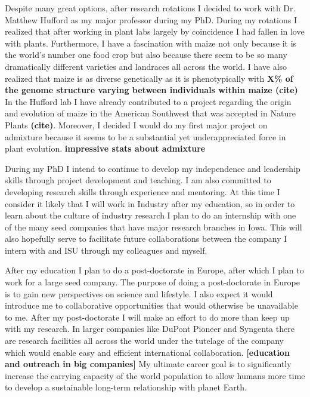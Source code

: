 \documentclass[12pt]{amsart}
\newcommand{\mbh}[1]{\textcolor{red}{ \emph{\scriptsize  #1}} }
\begin{document}
Despite many great options, after research rotations I decided to work with Dr. Matthew Hufford as my major professor during my PhD.
During my rotations I realized that after working in plant labs largely by coincidence I had fallen in love with plants.
Furthermore, I have a fascination with maize not only because it is the world's number one food crop but also because there seem to be so many dramatically different varieties and landraces all across the world.
I have also realized that maize is as diverse genetically as it is phenotypically with \textbf{X\% of the genome structure varying between individuals within maize (cite)}
In the Hufford lab I have already contributed to a project regarding the origin and evolution of maize in the American Southwest that was accepted in Nature Plants \textbf{(cite)}.
Moreover, I decided I would do my first major project on admixture because it seems to be a substantial yet underappreciated force in plant evolution.
\textbf{impressive stats about admixture}  %

During my PhD I intend to continue to develop my independence and leadership skills through project development and teaching.  
I am also committed to developing research skills through experience and mentoring.  
At this time I consider it likely that I will work in Industry after my education, so in order to learn about the culture of industry research I plan to do an internship with one of the many seed companies that have major research branches in Iowa.
This will also hopefully serve to facilitate future collaborations between the company I intern with and ISU through my colleagues and myself.

After my education I plan to do a post-doctorate in Europe, after which I plan to work for a large seed company.
The purpose of doing a post-doctorate in Europe is to gain new perspectives on science and lifestyle.
I also expect it would introduce me to collaborative opportunities that would otherwise be unavailable to me.
After my post-doctorate I will make an effort to do more than keep up with my research.
In larger companies like DuPont Pioneer and Syngenta there are research facilities all across the world under the tutelage of the company which would enable easy and efficient international collaboration. \textbf{[education and outreach in big companies]}
My ultimate career goal is to significantly increase the carrying capacity of the world population to allow humans more time to develop a sustainable long-term relationship with planet Earth.
\end{document}
